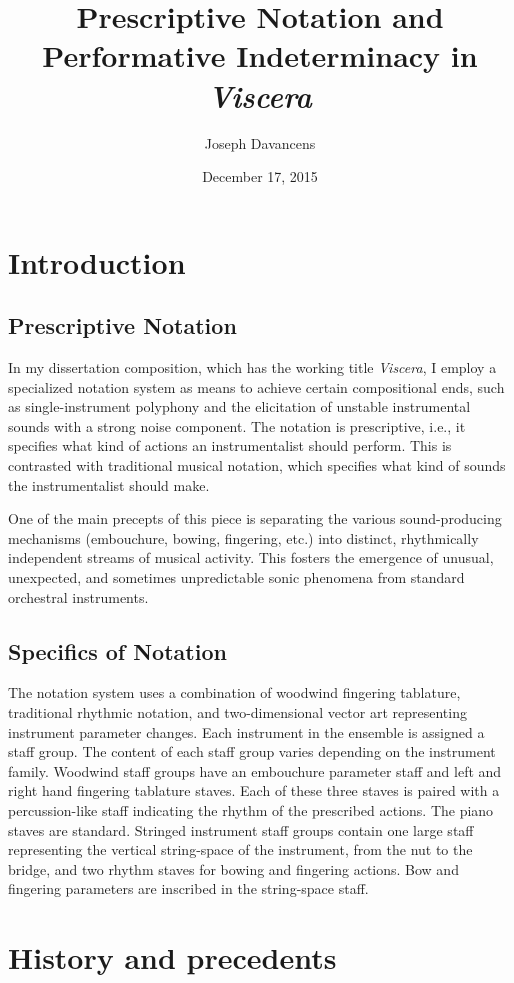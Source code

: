 \documentclass[11pt]{article}
\title{Prescriptive Notation and Performative Indeterminacy in \textit{Viscera}}
\author{Joseph Davancens}
\date{December 17, 2015}
\begin{document}
\maketitle

\section{Introduction}
\subsection{Prescriptive Notation}
In my dissertation composition, which has the working title \textit{Viscera}, I employ a specialized notation system as means to achieve certain compositional ends, such as single-instrument polyphony and the elicitation of unstable instrumental sounds with a strong noise component.  The notation is prescriptive, i.e., it specifies what kind of actions an instrumentalist should perform. This is contrasted with traditional musical notation, which specifies what kind of sounds the instrumentalist should make.

One of the main precepts of this piece is separating the various sound-producing mechanisms (embouchure, bowing, fingering, etc.) into distinct, rhythmically independent streams of musical activity. This fosters the emergence of unusual, unexpected, and sometimes unpredictable sonic phenomena from standard orchestral instruments.

\subsection{Specifics of Notation}
The notation system uses a combination of woodwind fingering tablature, traditional rhythmic notation, and two-dimensional vector art representing instrument parameter changes. Each instrument in the ensemble is assigned a staff group. The content of each staff group varies depending on the instrument family. Woodwind staff groups have an embouchure parameter staff and left and right hand fingering tablature staves. Each of these three staves is paired with a percussion-like staff indicating the rhythm of the prescribed actions. The piano staves are standard. Stringed instrument staff groups contain one large staff representing the vertical string-space of the instrument, from the nut to the bridge, and two rhythm staves for bowing and fingering actions. Bow and fingering parameters are inscribed in the string-space staff.

\section{History and precedents}
\end{document}
